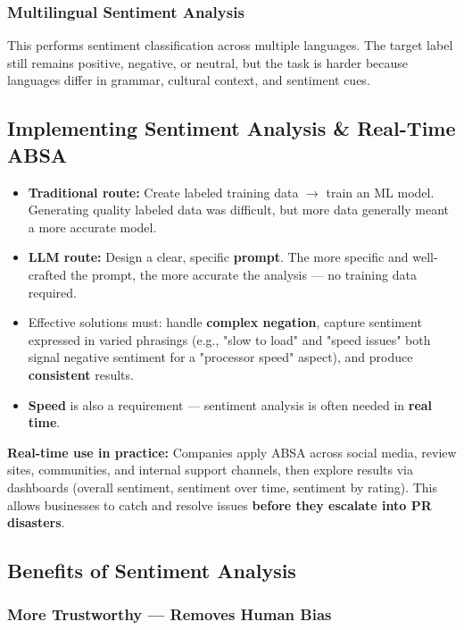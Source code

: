 \documentclass[12pt,openany]{book}
\begin{document}
\subsubsection{Multilingual Sentiment Analysis}

This performs sentiment classification across multiple languages. The target label still remains positive, negative, or neutral, but the task is harder because languages differ in grammar, cultural context, and sentiment cues.

\subsection{Implementing Sentiment Analysis \& Real-Time ABSA}

\begin{itemize}[leftmargin=*]
    \item \textbf{Traditional route:} Create labeled training data \(\rightarrow\) train an ML model. Generating quality labeled data was difficult, but more data generally meant a more accurate model.
    \item \textbf{LLM route:} Design a clear, specific \textbf{prompt}. The more specific and well-crafted the prompt, the more accurate the analysis --- no training data required.
    \item Effective solutions must: handle \textbf{complex negation}, capture sentiment expressed in varied phrasings (e.g., "slow to load" and "speed issues" both signal negative sentiment for a "processor speed" aspect), and produce \textbf{consistent} results.
    \item \textbf{Speed} is also a requirement --- sentiment analysis is often needed in \textbf{real time}.
\end{itemize}

\textbf{Real-time use in practice:} Companies apply ABSA across social media, review sites, communities, and internal support channels, then explore results via dashboards (overall sentiment, sentiment over time, sentiment by rating). This allows businesses to catch and resolve issues \textbf{before they escalate into PR disasters}.

\subsection{Benefits of Sentiment Analysis}

\subsubsection{More Trustworthy --- Removes Human Bias}
\end{document}
